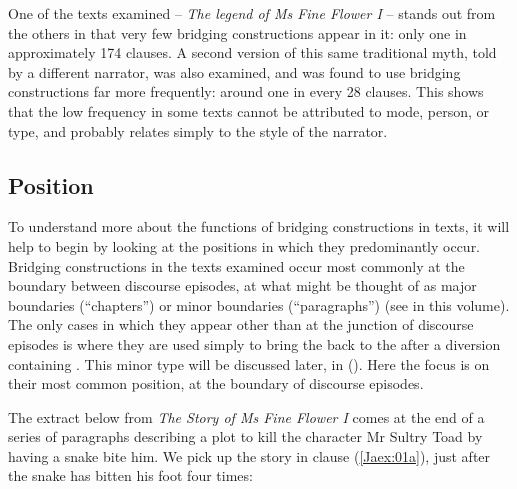 \documentclass[output=paper]{LSP/langsci}
\begin{document}
One of the texts examined -- \textit{The legend of Ms Fine Flower I} -- stands out from the others in that very few bridging constructions appear in it: only one in approximately 174 clauses. A second version of this same traditional myth, told by a different narrator, was also examined, and was found to use bridging constructions far more frequently: around one in every 28 clauses. This shows that the low frequency in some texts cannot be attributed to  mode, person, or type, and probably relates simply to the style of the narrator.

%
\subsection{Position}
\label{JaPosition}
To understand more about the functions of bridging constructions in  texts, it will help to begin by looking at the positions in which they predominantly occur. Bridging constructions in the texts examined occur most commonly at the boundary between discourse episodes, at what might be thought of as major boundaries (``chapters'') or minor boundaries (``paragraphs'') (see \citeauthor{guerin18} in this volume). The only cases in which they appear other than at the junction of discourse episodes is where they are used simply to bring the  back to the  after a diversion containing . This minor type will be discussed later, in (). Here the focus is on their most common position, at the boundary of discourse episodes.
 
The extract below from \textit{The Story of Ms Fine Flower I} comes at the end of a series of paragraphs describing a plot to kill the character Mr Sultry Toad by having a snake bite him. We pick up the story in clause (\ref{Jaex:01a}), just after the snake has bitten his foot four times:
 
\end{document}
